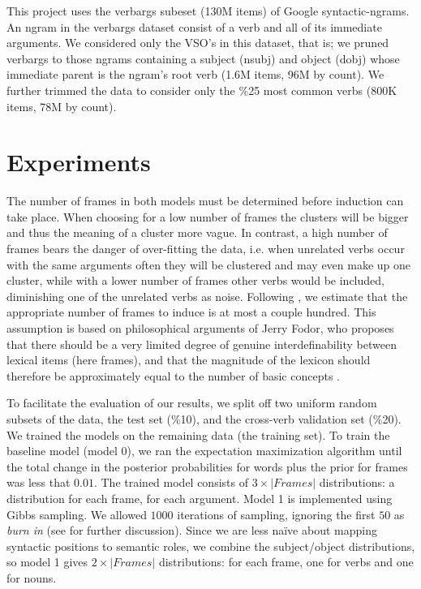 \documentclass{article} %
\begin{document}
This project uses the verbargs subeset (130M items) of Google syntactic-ngrams.
An ngram in the verbargs dataset consist of a verb and all of its 
immediate arguments.
We considered only the VSO's in this dataset, that is; we pruned verbargs to
those ngrams containing a subject (nsubj) and object (dobj) whose immediate parent
is the ngram's root verb (1.6M items, 96M by count). 
We further trimmed the data to consider only the \%25 most common verbs 
(800K items, 78M by count).



\section{Experiments}
The number of frames in both models must be determined before induction can take place. When choosing for a low number of frames the clusters will be bigger and thus the meaning of a cluster more vague. In contrast, a high number of frames bears the danger of over-fitting the data, i.e. when unrelated verbs occur with the same arguments often they will be clustered and may even make up one cluster, while with a lower number of frames other verbs would be included, diminishing one of the unrelated verbs as noise. Following \citet{rooth1999}, we estimate that the appropriate number of frames to induce is at most a couple hundred. This assumption is based on philosophical arguments of Jerry Fodor, who proposes that there should be a very limited degree of genuine interdefinability between lexical items (here frames), and that the magnitude of the lexicon should therefore be approximately equal to the number of basic concepts \citep{fodor1998}.

To facilitate the evaluation of our results, we split off two uniform random subsets of the data, the test set (\%10), and the cross-verb validation set (\%20). We trained the models on the remaining data (the training set). To train the baseline model (model 0), we ran the expectation maximization algorithm until the total change in the posterior probabilities for words plus the prior for frames was less that $0.01$. The trained model consists of $3\times|Frames|$ distributions: a distribution for each frame, for each argument. Model 1 is implemented using Gibbs sampling. We allowed $1000$ iterations of sampling, ignoring the first $50$ as \emph{burn in} (see \citet{raftery1992} for further discussion). Since we are less na\"ive about mapping syntactic positions to semantic roles, we combine the subject/object distributions, so model 1 gives $2\times|Frames|$ distributions: for each frame, one for verbs and one for nouns.
\end{document}
